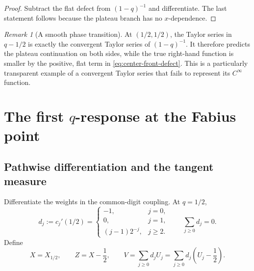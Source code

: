 \documentclass[11pt,oneside]{article}
\theoremstyle{definition}
\theoremstyle{remark}
\newtheorem{remark}[theorem]{Remark}
\begin{document}
\begin{proof}
Subtract the flat defect from \((1-q)^{-1}\) and differentiate.  The last statement follows
because the plateau branch has no \(x\)-dependence.
\end{proof}

\begin{remark}[A smooth phase transition]
At \((1/2,1/2)\), the Taylor series in \(q-1/2\) is exactly the convergent Taylor series of
\((1-q)^{-1}\).  It therefore predicts the plateau continuation on both sides, while the true
right-hand function is smaller by the positive, flat term in
\eqref{eq:center-front-defect}.  This is a particularly transparent example of a convergent
Taylor series that fails to represent its \(C^\infty\) function.
\end{remark}

\section{The first \texorpdfstring{\(q\)}{q}-response at the Fabius point}
\label{sec:response}

\subsection{Pathwise differentiation and the tangent measure}

Differentiate the weights in the common-digit coupling.  At \(q=1/2\),
\begin{equation}
 d_j:=c_j'(1/2)=
 \begin{cases}
 -1,&j=0,\\
 0,&j=1,\\
 (j-1)2^{-j},&j\ge2.
 \end{cases}
 \qquad \sum_{j\ge0}d_j=0.
 \label{eq:dj}
\end{equation}
Define
\begin{equation}
 X=X_{1/2},\qquad Z=X-\frac12,
 \qquad V=\sum_{j\ge0}d_jU_j
       =\sum_{j\ge0}d_j\left(U_j-\frac12\right).
 \label{eq:XV}
\end{equation}
\end{document}
